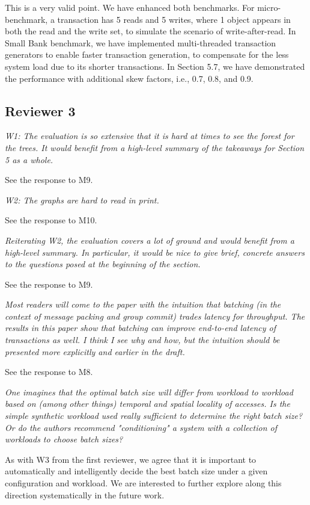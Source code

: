 \documentclass{article}
\begin{document}
This is a very valid point. We have enhanced both benchmarks. For micro-benchmark, a transaction has 5 reads and 5 writes, where 1 object appears in both the read and the write set, to simulate the scenario of write-after-read. In Small Bank benchmark, we have implemented multi-threaded transaction generators to enable faster transaction generation, to compensate for the less system load due to its shorter transactions. In Section 5.7, we have demonstrated the performance with additional skew factors, i.e., 0.7, 0.8, and 0.9.

\subsection{Reviewer 3}

\emph{W1: The evaluation is so extensive that it is hard at times to see the forest for the trees. It would benefit from a high-level summary of the takeaways for Section 5 as a whole. }

See the response to M9.

\emph{W2: The graphs are hard to read in print.}

See the response to M10.

\emph{Reiterating W2, the evaluation covers a lot of ground and would benefit from a high-level summary. In particular, it would be nice to give brief, concrete answers to the questions posed at the beginning of the section.}

See the response to M9.

\emph{Most readers will come to the paper with the intuition that batching (in the context of message packing and group commit) trades latency for throughput. The results in this paper show that batching can improve end-to-end latency of transactions as well. I think I see why and how, but the intuition should be presented more explicitly and earlier in the draft.}

See the response to M8.

\emph{One imagines that the optimal batch size will differ from workload to workload based on (among other things) temporal and spatial locality of accesses. Is the simple synthetic workload used really sufficient to determine the right batch size? Or do the authors recommend "conditioning" a system with a collection of workloads to choose batch sizes?}

As with W3 from the first reviewer, we agree that it is important to automatically and intelligently decide the best batch size under a given configuration and workload. We are interested to further explore along this direction systematically in the future work. 
\end{document}
